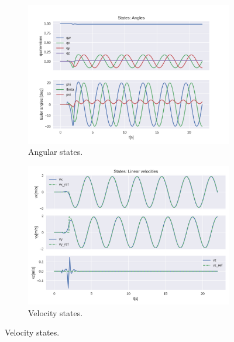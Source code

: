 \documentclass{thesisreport}
\begin{document}
\begin{figure}[H]
\medskip
	\begin{subfigure}{0.45\textwidth}
		\includegraphics[width=\linewidth]{Images/acados_simulations/circular_trajectory/3D_quadrotor/angleStates.png}
		\caption{Angular states.} \label{fig:3D_sim_angles}
	\end{subfigure}\hspace*{\fill}
	\begin{subfigure}{0.45\textwidth}
		\includegraphics[width=\linewidth]{Images/acados_simulations/circular_trajectory/3D_quadrotor/velStates.png}
		\caption{Velocity states.} \label{fig:3D_sim_velocities}
	\end{subfigure}


\end{figure}
\end{document}
